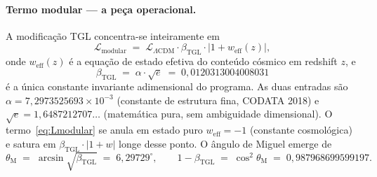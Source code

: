 \documentclass[12pt,a4paper]{article}
\newcommand{\betatgl}{\beta_{\text{TGL}}}
\newcommand{\thetaM}{\theta_{\text{M}}}
\newcommand{\TGL}{\textsc{TGL}}
\begin{document}
\paragraph{Termo modular --- a peça operacional.}
A modificação \TGL{} concentra-se inteiramente em
\begin{equation}
\boxed{\;
\mathcal{L}_{\text{modular}} \;=\;
\mathcal{L}_{\Lambda\text{CDM}} \cdot \betatgl \cdot |1 + w_{\text{eff}}(z)|,
\;}
\label{eq:Lmodular}
\end{equation}
onde $w_{\text{eff}}(z)$ é a equação de estado efetiva do conteúdo cósmico
em redshift $z$, e
\begin{equation}
\boxed{\;\betatgl \;=\; \alpha \cdot \sqrt{e} \;=\; 0{,}0120313004008031\;}
\label{eq:beta-definition}
\end{equation}
é a única constante invariante adimensional do programa.  As duas entradas
são $\alpha = 7{,}2973525693 \times 10^{-3}$ (constante de estrutura fina,
CODATA 2018) e $\sqrt{e} = 1{,}6487212707\ldots$ (matemática pura, sem
ambiguidade dimensional).  O termo~\eqref{eq:Lmodular} se anula em estado
puro $w_{\text{eff}} = -1$ (constante cosmológica) e satura em
$\betatgl \cdot |1+w|$ longe desse ponto.  O ângulo de Miguel emerge de
\begin{equation}
\thetaM \;=\; \arcsin \sqrt{\betatgl} \;=\; 6{,}29729^{\circ},
\qquad
1 - \betatgl \;=\; \cos^2 \thetaM \;=\; 0{,}987968699599197.
\label{eq:theta-M}
\end{equation}
\end{document}
